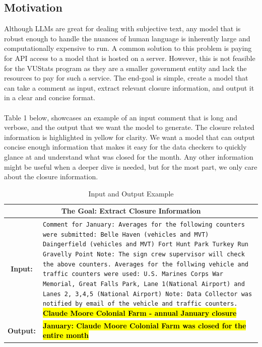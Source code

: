 \documentclass[12pt]{article}
\begin{document}
\subsection{Motivation}
Although LLMs are great for dealing with subjective text, any model that is robust enough to handle the nuances of human language is inherently large and computationally expensive to run. A common solution to this problem is paying for API access to a model that is hosted on a server. However, this is not feasible for the VUStats program as they are a smaller government entity and lack the resources to pay for such a service. The end-goal is simple, create a model that can take a comment as input, extract relevant closure information, and output it in a clear and concise format.
\\
\\
Table 1 below, showcases an example of an input comment that is long and verbose, and the output that we want the model to generate. The closure related information is highlighted in yellow for clarity. We want a model that can output concise enough information that makes it easy for the data checkers to quickly glance at and understand what was closed for the month. Any other information might be useful when a deeper dive is needed, but for the most part, we only care about the closure information.

\begin{table}[H]
    \centering
    \begin{singlespacing}
    \begin{tabular}{|c|p{}|}
        \hline
        \multicolumn{2}{|c|}{\textbf{The Goal: Extract Closure Information}} \\
        \hline
        \textbf{Input:} & \small \texttt{Comment for January: Averages for the following counters were submitted: Belle Haven (vehicles and MVT) Daingerfield (vehicles and MVT) Fort Hunt Park Turkey Run Gravelly Point  Note: The sign crew supervisor will check the above counters. Averages for the follwing vehicle and traffic counters were used: U.S. Marines Corps War Memorial, Great Falls Park, Lane 1(National Airport) and Lanes 2, 3,4,5 (National Airport) Note: Data Collector was notified by email of the vehicle and traffic counters.} \textbf{\hl{Claude Moore Colonial Farm - annual January closure}} \\
        \hline
        \textbf{Output:} & \small \textbf{\hl{January: Claude Moore Colonial Farm was closed for the entire month}} \\
        \hline
    \end{tabular}
    \end{singlespacing}
    \caption{Input and Output Example}
\end{table}
\end{document}
